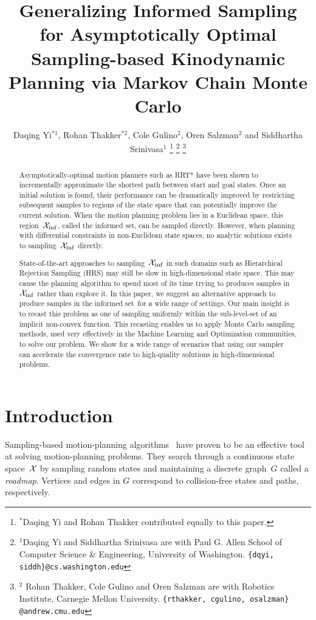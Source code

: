 \documentclass[letterpaper, 10 pt, conference]{ieeeconf}  %
\title{\LARGE \bf
Generalizing Informed Sampling
for Asymptotically Optimal Sampling-based Kinodynamic Planning via Markov Chain
Monte Carlo
}
\author{
Daqing Yi$^{*1}$,
Rohan Thakker$^{*2}$,
Cole Gulino$^{2}$, 
Oren Salzman$^{2}$ and
Siddhartha Srinivasa$^{1}$
\thanks{$^{*}$Daqing Yi and Rohan Thakker contributed equally to this paper.}
\thanks{$^{1}$Daqing Yi and Siddhartha Srinivasa are with Paul G. Allen School of Computer Science \& Engineering, University of Washington.
{\tt\small \{dqyi, siddh\}@cs.washington.edu}}
\thanks{$^{2}$ Rohan Thakker, Cole Gulino and Oren Salzman are with Robotics Institute, Carnegie Mellon University.
{\tt\small \{rthakker, cgulino, osalzman\} @andrew.cmu.edu}}%
}
\begin{document}
\maketitle
\thispagestyle{empty}
\pagestyle{empty}


\begin{abstract}
Asymptotically-optimal motion planners such as RRT* have been shown to incrementally approximate the shortest path between start and goal states.
Once an initial solution is found, their performance can be dramatically improved by restricting subsequent samples to regions of the state space that can potentially improve the current solution.
When the motion planning problem lies in a Euclidean space, this region~$\mathcal{X}_{\rm {inf}}$, called the informed set, can be sampled directly.
However, when planning with differential constraints in non-Euclidean state spaces, no analytic solutions exists to sampling~$\mathcal{X}_{\rm {inf}}$ directly.

State-of-the-art approaches to sampling~$\mathcal{X}_{\rm {inf}}$ in such domains such as Hierarchical Rejection Sampling (HRS) may still be slow in high-dimensional state space.
This may cause the planning algorithm to spend most of its time trying to produces samples in~$\mathcal{X}_{\rm {inf}}$ rather than explore it.
In this paper, we suggest an alternative approach to produce samples in the informed set~\Cinf for a wide range of settings.
Our main insight is to recast this problem as one of sampling uniformly within the sub-level-set of an implicit non-convex function.
This recasting enables us to apply Monte Carlo sampling methods, used very effectively in the Machine Learning and Optimization communities, to solve our problem.
We show for a wide range of scenarios that using our sampler can accelerate the convergence rate to high-quality solutions in high-dimensional problems.
\end{abstract}


\section{Introduction}
\label{sec:intro}


Sampling-based motion-planning algorithms~\cite{L06} have proven to be an effective tool at solving motion-planning problems.
They search through a continuous state space~$\mathcal{X}$ by sampling random states and maintaining a discrete graph~$G$ called a \emph{roadmap}.
Vertices and edges in $G$ correspond to collision-free states and paths, respectively.
\end{document}
